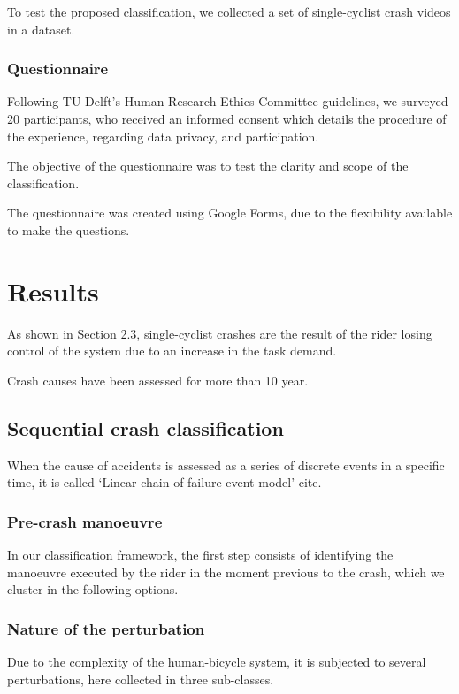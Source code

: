 \documentclass{article}
\begin{document}
To test the proposed classification, we collected a set of single-cyclist crash videos in a dataset. 

\subsubsection{Questionnaire}

Following TU Delft’s Human Research Ethics Committee guidelines, we surveyed 20 participants, who received an informed consent which details the procedure of the experience, regarding data privacy, and participation.

The objective of the questionnaire was to test the clarity and scope of the classification.

The questionnaire was created using Google Forms, due to the flexibility available to make the questions.

\section{Results}

As shown in Section 2.3, single-cyclist crashes are the result of the rider losing control of the system due to an increase in the task demand. 

Crash causes have been assessed for more than 10 year.

\subsection{Sequential crash classification}

When the cause of accidents is assessed as a series of discrete events in a specific time, it is called ‘Linear chain-of-failure event model’ cite{}.

\subsubsection{Pre-crash manoeuvre}

In our classification framework, the first step consists of identifying the manoeuvre executed by the rider in the moment previous to the crash, which we cluster in the following options.

\subsubsection{Nature of the perturbation}

Due to the complexity of the human-bicycle system, it is subjected to several perturbations, here collected in three sub-classes.
\end{document}
